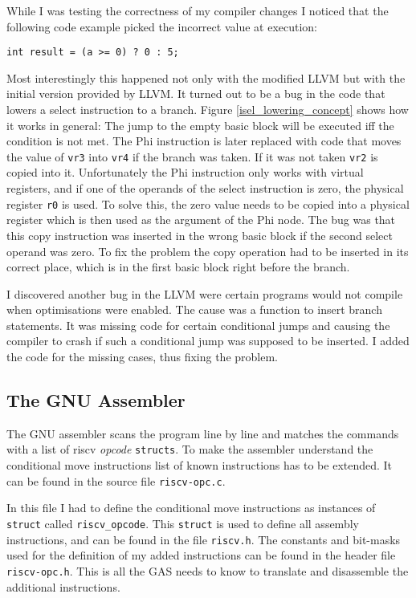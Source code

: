 \documentclass[12pt,twoside,notitlepage]{report}
\begin{document}
While I was testing the correctness of my compiler changes I noticed that the following code example picked the incorrect value at execution:
\begin{verbatim}
int result = (a >= 0) ? 0 : 5;
\end{verbatim}
Most interestingly this happened not only with the modified LLVM but with the initial version provided by LLVM. It turned out to be a bug in the code that lowers a select instruction to a branch. Figure \ref{isel_lowering_concept} shows how it works in general: The jump to the empty basic block will be executed iff the condition is not met. The Phi instruction is later replaced with code that moves the value of \texttt{vr3} into \texttt{vr4} if the branch was taken. If it was not taken \texttt{vr2} is copied into it.
Unfortunately the Phi instruction only works with virtual registers, and if one of the operands of the select instruction is zero, the physical register \texttt{r0} is used. To solve this, the zero value needs to be copied into a physical register which is then used as the argument of the Phi node. The bug was that this copy instruction was inserted in the wrong basic block if the second select operand was zero. To fix the problem the copy operation had to be inserted in its correct place, which is in the first basic block right before the branch. 

I discovered another bug in the LLVM were certain programs would not compile when optimisations were enabled. The cause was a function to insert branch statements. It was missing code for certain conditional jumps and causing the compiler to crash if such a conditional jump was supposed to be inserted. I added the code for the missing cases, thus fixing the problem.


\subsection{The GNU Assembler}

The GNU assembler scans the program line by line and matches the commands with a list of riscv \textit{opcode} \texttt{structs}. To make the assembler understand the conditional move instructions  list of known instructions has to be extended. It can be found in the source file \texttt{riscv-opc.c}.

In this file I had to define the conditional move instructions as instances of \texttt{struct} called \texttt{riscv\_opcode}. This \texttt{struct} is used to define all assembly instructions, and can be found in the file \texttt{riscv.h}. The constants and bit-masks used for the definition of my added instructions can be found in the header file \texttt{riscv-opc.h}. This is all the GAS needs to know to translate and disassemble the additional instructions.
\end{document}
